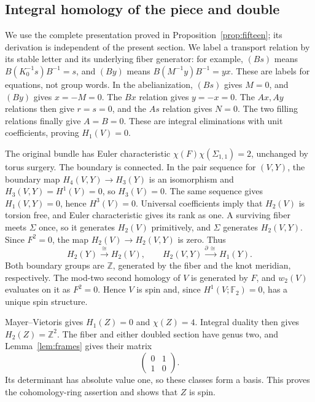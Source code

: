 \documentclass[11pt]{amsart}
\theoremstyle{definition}
\theoremstyle{remark}
\newcommand{\Z}{\mathbb Z}
\newcommand{\Ftwo}{\mathbb F_2}
\begin{document}
\subsection{Integral homology of the piece and double}
We use the complete presentation proved in
Proposition~\ref{prop:fifteen}; its derivation is independent of the
present section. We label a transport relation by its stable letter
and its underlying fiber generator: for example, $(Bs)$ means
$B(K_0^{-1}s)B^{-1}=s$, and $(By)$ means
$B(M^{-1}y)B^{-1}=yx$. These are labels for equations, not group
words. In the abelianization, $(Bs)$ gives $M=0$, and $(By)$ gives $x=-M=0$.
The $Bx$ relation gives $y=-x=0$. The $Ax,Ay$ relations then give
$r=s=0$, and the $As$ relation gives $N=0$. The two filling relations
finally give $A=B=0$. These are integral eliminations with unit
coefficients, proving $H_1(V)=0$.

The original bundle has Euler characteristic
$\chi(F)\chi(\Sigma_{1,1})=2$, unchanged by torus surgery.
The boundary is connected. In the pair sequence for $(V,Y)$, the
boundary map $H_4(V,Y)\to H_3(Y)$ is an isomorphism and
$H_3(V,Y)=H^1(V)=0$, so $H_3(V)=0$. The same sequence gives
$H_1(V,Y)=0$, hence $H^3(V)=0$. Universal coefficients imply that
$H_2(V)$ is torsion free, and Euler characteristic gives its rank
as one. A surviving fiber meets $\Sigma$ once, so it generates
$H_2(V)$ primitively, and $\Sigma$ generates $H_2(V,Y)$.
Since $F^2=0$, the map $H_2(V)\to H_2(V,Y)$ is zero. Thus
\begin{equation}\label{eq:homology-maps}
 H_2(Y)\xrightarrow{\cong}H_2(V),\qquad
 H_2(V,Y)\xrightarrow{\partial\,\cong}H_1(Y).
\end{equation}
Both boundary groups are $\Z$, generated by the fiber and the
knot meridian, respectively. The mod-two second homology of $V$
is generated by $F$, and $w_2(V)$ evaluates on it as $F^2=0$.
Hence $V$ is spin and, since $H^1(V;\Ftwo)=0$, has a unique spin
structure.

Mayer--Vietoris gives $H_1(Z)=0$ and $\chi(Z)=4$. Integral duality
then gives $H_2(Z)=\Z^2$. The fiber and either doubled section
have genus two, and Lemma~\ref{lem:frames} gives their matrix
\begin{equation}\label{eq:hyperbolic}
                          \begin{pmatrix}0&1\\1&0\end{pmatrix}.
\end{equation}
Its determinant has absolute value one, so these classes form a basis.
This proves the cohomology-ring assertion and shows that $Z$ is spin.
\end{document}
